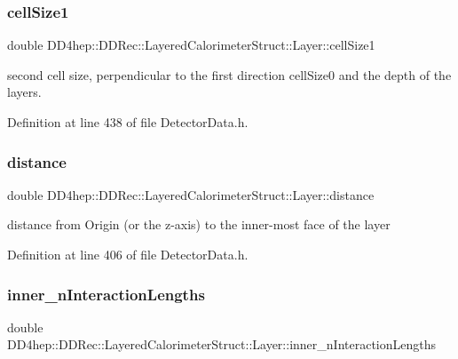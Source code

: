 \subsubsection{\texorpdfstring{cell\+Size1}{cellSize1}}
{\footnotesize\ttfamily double D\+D4hep\+::\+D\+D\+Rec\+::\+Layered\+Calorimeter\+Struct\+::\+Layer\+::cell\+Size1}



second cell size, perpendicular to the first direction cell\+Size0 and the depth of the layers. 



Definition at line 438 of file Detector\+Data.\+h.

\hypertarget{struct_d_d4hep_1_1_d_d_rec_1_1_layered_calorimeter_struct_1_1_layer_a27ab51429cf061a2b184dc248402a10f}{}\label{struct_d_d4hep_1_1_d_d_rec_1_1_layered_calorimeter_struct_1_1_layer_a27ab51429cf061a2b184dc248402a10f} 
\subsubsection{\texorpdfstring{distance}{distance}}
{\footnotesize\ttfamily double D\+D4hep\+::\+D\+D\+Rec\+::\+Layered\+Calorimeter\+Struct\+::\+Layer\+::distance}



distance from Origin (or the z-\/axis) to the inner-\/most face of the layer 



Definition at line 406 of file Detector\+Data.\+h.

\hypertarget{struct_d_d4hep_1_1_d_d_rec_1_1_layered_calorimeter_struct_1_1_layer_a096850bcaa7ae3e30b2c135cdcfc4502}{}\label{struct_d_d4hep_1_1_d_d_rec_1_1_layered_calorimeter_struct_1_1_layer_a096850bcaa7ae3e30b2c135cdcfc4502} 
\subsubsection{\texorpdfstring{inner\+\_\+n\+Interaction\+Lengths}{inner\_nInteractionLengths}}
{\footnotesize\ttfamily double D\+D4hep\+::\+D\+D\+Rec\+::\+Layered\+Calorimeter\+Struct\+::\+Layer\+::inner\+\_\+n\+Interaction\+Lengths}



